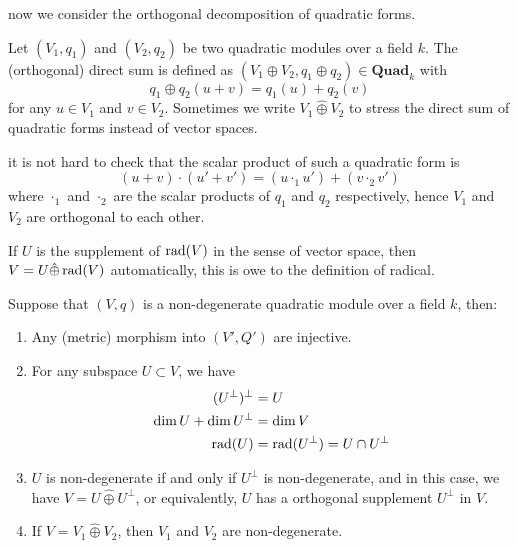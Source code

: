 now we consider the orthogonal decomposition of quadratic forms.

\begin{definition}
    Let \((V_1,q_1)\) and \((V_2,q_2)\) be two quadratic modules over a field \(k\). The (orthogonal) direct sum is defined as \((V_1 \oplus V_2, q_1 \oplus q_2) \in \mathbf{Quad}_k\) with
    \[q_1 \oplus q_2 (u+v) = q_1(u) +q_2(v)\]
    for any \(u \in V_1\) and \(v \in V_2\). Sometimes we write \(V_1 \hat{\oplus} V_2\) to stress the direct sum of quadratic forms instead of vector spaces.
\end{definition}

it is not hard to check that the scalar product of such a quadratic form is
\[(u+v)\cdot (u'+v') = (u \cdot_1 u') + (v \cdot_2 v')\]
where \(\cdot_1\) and \(\cdot_2\) are the scalar products of \(q_1\) and \(q_2\) respectively, hence \(V_1\) and \(V_2\) are orthogonal to each other.

\begin{remark}
    If \(U\) is the supplement of \(\operatorname{rad} (V)\) in the sense of vector space, then \(V = U \hat{\oplus} \operatorname{rad}(V)\) automatically, this is owe to the definition of radical.
\end{remark}

\begin{proposition}
    Suppose that \((V,q)\) is a non-degenerate quadratic module over a field \(k\), then: 
    \begin{enumerate}
        \item Any (metric) morphism into \((V',Q')\) are injective.
        \item For any subspace \(U \subset V\), we have
        \begin{align*}
            (U^\perp)^\perp &= U \\
            \dim U + \dim U^\perp &= \dim V \\
            \operatorname{rad} (U) &= \operatorname{rad} (U^\perp) = U \cap U^\perp
        \end{align*}
        \item \(U\) is non-degenerate if and only if \(U^\perp\) is non-degenerate, and in this case, we have \(V = U \hat{\oplus} U^\perp\), or equivalently, \(U\) has a orthogonal supplement \(U^\perp\) in \(V\).
        \item If \(V = V_1 \hat{\oplus} V_2\), then \(V_1\) and \(V_2\) are non-degenerate.
    \end{enumerate}
\end{proposition}

